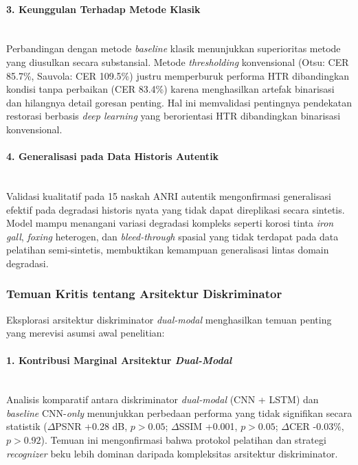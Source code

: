 \documentclass[12pt,a4paper]{article}
\begin{document}
\paragraph{3. Keunggulan Terhadap Metode Klasik} \mbox{}\\[0.1em]
Perbandingan dengan metode \textit{baseline} klasik menunjukkan superioritas metode yang diusulkan secara substansial. Metode \textit{thresholding} konvensional (Otsu: CER 85.7\%, Sauvola: CER 109.5\%) justru memperburuk performa HTR dibandingkan kondisi tanpa perbaikan (CER 83.4\%) karena menghasilkan artefak binarisasi dan hilangnya detail goresan penting. Hal ini memvalidasi pentingnya pendekatan restorasi berbasis \textit{deep learning} yang berorientasi HTR dibandingkan binarisasi konvensional.

\paragraph{4. Generalisasi pada Data Historis Autentik} \mbox{}\\[0.1em]
Validasi kualitatif pada 15 naskah ANRI autentik mengonfirmasi generalisasi efektif pada degradasi historis nyata yang tidak dapat direplikasi secara sintetis. Model mampu menangani variasi degradasi kompleks seperti korosi tinta \textit{iron gall}, \textit{foxing} heterogen, dan \textit{bleed-through} spasial yang tidak terdapat pada data pelatihan semi-sintetis, membuktikan kemampuan generalisasi lintas domain degradasi.

\vspace{0.8em}

\subsubsection{Temuan Kritis tentang Arsitektur Diskriminator}
\label{subsubsec:temuan-diskriminator}

Eksplorasi arsitektur diskriminator \textit{dual-modal} menghasilkan temuan penting yang merevisi asumsi awal penelitian:

\paragraph{1. Kontribusi Marginal Arsitektur \textit{Dual-Modal}} \mbox{}\\[0.1em]
Analisis komparatif antara diskriminator \textit{dual-modal} (CNN + LSTM) dan \textit{baseline} CNN-\textit{only} menunjukkan perbedaan performa yang tidak signifikan secara statistik ($\Delta$PSNR +0.28 dB, $p>0.05$; $\Delta$SSIM +0.001, $p>0.05$; $\Delta$CER -0.03\%, $p>0.92$). Temuan ini mengonfirmasi bahwa protokol pelatihan dan strategi \textit{recognizer} beku lebih dominan daripada kompleksitas arsitektur diskriminator.
\end{document}
